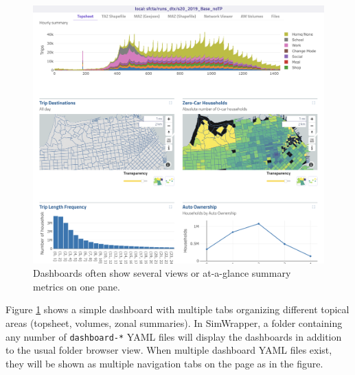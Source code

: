 \begin{figure}[ht]
  \centering
  \includegraphics[width=0.7\linewidth]{chapters/31-simwrapper/images/dashboard.png}
  \caption{Dashboards often show several views or at-a-glance summary metrics on one pane.}
  \label{fig:simwrapper-dashboard}
\end{figure}


Figure \ref{fig:simwrapper-dashboard} shows a simple dashboard with multiple tabs organizing different topical areas (topsheet, volumes, zonal summaries). In SimWrapper, a folder containing any number of \texttt{dashboard-*} YAML files will display the dashboards in addition to the usual folder browser view. When multiple dashboard YAML files exist, they will be shown as multiple navigation tabs on the page as in the figure.

